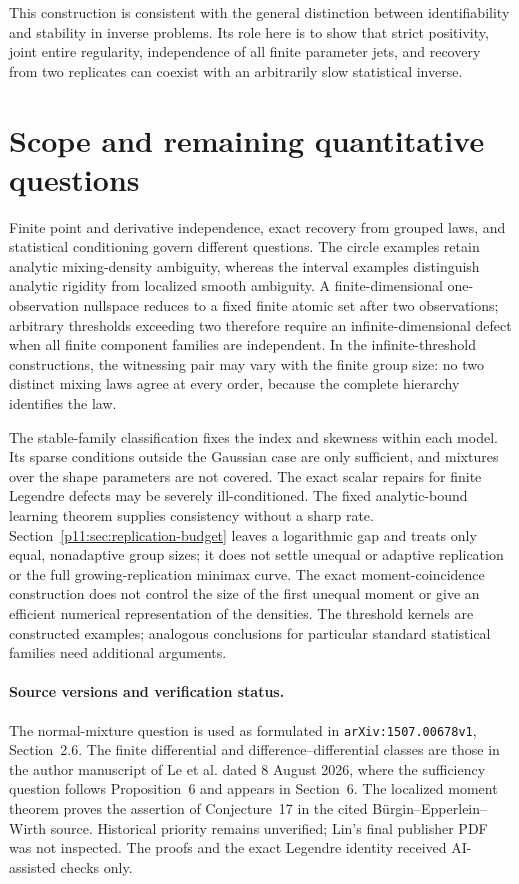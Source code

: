 \documentclass[11pt,letterpaper]{article}
\theoremstyle{definition}
\theoremstyle{remark}
\newcommand{\1}{\mathbf 1}
\begin{document}
This construction is consistent with the general distinction between
identifiability and stability in inverse problems.  Its role here is
to show that strict positivity, joint entire regularity, independence
of all finite parameter jets, and recovery from two replicates can
coexist with an arbitrarily slow statistical inverse.






\section{Scope and remaining quantitative questions}
\label{p05:sec:mixture-scope}

Finite point and derivative independence, exact recovery from grouped
laws, and statistical conditioning govern different questions.
The circle examples retain analytic mixing-density ambiguity, whereas
the interval examples distinguish analytic rigidity from localized
smooth ambiguity. A finite-dimensional one-observation nullspace
reduces to a fixed finite atomic set after two observations; arbitrary
thresholds exceeding two therefore require an infinite-dimensional
defect when all finite component families are independent.
In the infinite-threshold constructions, the witnessing pair may vary
with the finite group size: no two distinct mixing laws agree at every
order, because the complete hierarchy identifies the law.

The stable-family classification fixes the index and skewness within
each model. Its sparse conditions outside the Gaussian case are only
sufficient, and mixtures over the shape parameters are not covered.
The exact scalar repairs for finite Legendre defects may be severely
ill-conditioned. The fixed analytic-bound learning theorem supplies
consistency without a sharp rate. Section~\ref{p11:sec:replication-budget}
leaves a logarithmic gap and treats only equal, nonadaptive group sizes;
it does not settle unequal or adaptive replication or the full
growing-replication minimax curve. The exact moment-coincidence
construction does not control the size of the first unequal moment or
give an efficient numerical representation of the densities.
The threshold kernels are constructed examples; analogous conclusions
for particular standard statistical families need additional arguments.

\paragraph{Source versions and verification status.}
The normal-mixture question is used as formulated in
\texttt{arXiv:1507.00678v1}, Section~2.6. The finite differential and
difference--differential classes are those in the author manuscript
of Le et al. dated 8 August 2026, where the sufficiency question follows
Proposition~6 and appears in Section~6. The localized moment theorem
proves the assertion of Conjecture~17 in the cited
B\"urgin--Epperlein--Wirth source. Historical priority remains
unverified; Lin's final publisher PDF was not inspected. The proofs
and the exact Legendre identity received AI-assisted checks only.
\end{document}
